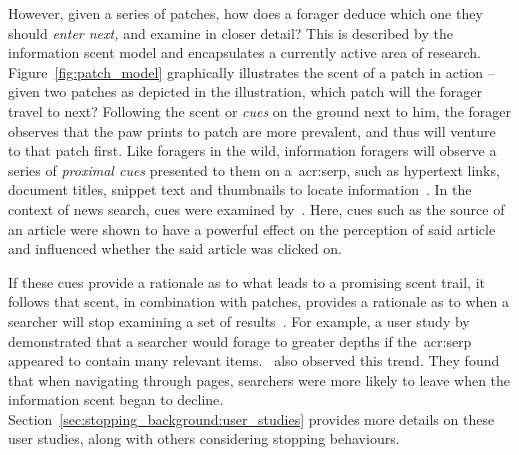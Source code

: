 However, given a series of patches, how does a forager deduce which one they should \emph{enter next,} and examine in closer detail? This is described by the information scent model and encapsulates a currently active area of research. Figure~\ref{fig:patch_model} graphically illustrates the scent of a patch in action -- given two patches as depicted in the illustration, which patch will the forager travel to next? Following the scent or \emph{cues} on the ground next to him, the forager observes that the paw prints to patch  are more prevalent, and thus will venture to that patch first. Like foragers in the wild, information foragers will observe a series of \emph{proximal cues} presented to them on a~\gls{acr:serp}, such as hypertext links, document titles, snippet text and thumbnails to locate information~\citep{pirolli1995ift, pirolli1999ift, chi2001information_scent, oltston2003scenttrails, pirolli2007ift}. In the context of news search, cues were examined by~\cite{sundar2007news_scent}. Here, cues such as the source of an article were shown to have a powerful effect on the perception of said article and influenced whether the said article was clicked on.

If these cues provide a rationale as to what leads to a promising scent trail, it follows that scent, in combination with patches, provides a rationale as to when a searcher will stop examining a set of results~\citep{pirolli1999ift, wu2012dc, wu2014information_scent}. For example, a user study by~\cite{wu2014information_scent} demonstrated that a searcher would forage to greater depths if the~\gls{acr:serp} appeared to contain many relevant items.~\cite{card2001scent_graphs} also observed this trend. They found that when navigating through pages, searchers were more likely to leave when the information scent began to decline. Section~\ref{sec:stopping_background:user_studies} provides more details on these user studies, along with others considering stopping behaviours.

